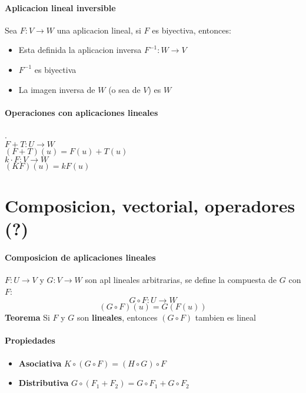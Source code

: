 \documentclass[10pt]{article}
\begin{document}
\paragraph{Aplicacion lineal inversible}

Sea $F:V\rightarrow W$ una aplicacion lineal, si $F$ es biyectiva, entonces:

\begin{itemize}
	\item Esta definida la aplicacion inversa $F^{-1}: W \rightarrow V$
	\item $F^{-1}$ es biyectiva
	\item La imagen inversa de $W$ (o sea de $V$) es $W$
\end{itemize}

\paragraph{Operaciones con aplicaciones lineales}.\\

$F+T: U \rightarrow W$\\
$(F+T)(u) = F(u) + T(u)$\\
\linebreak
$k\cdot F: V \rightarrow W$\\
$(KF)(u) = kF(u)$

\section{Composicion, vectorial, operadores (?)}

\paragraph{Composicion de aplicaciones lineales} $F: U \rightarrow V$ y $G: V \rightarrow W$ son apl lineales arbitrarias, se define la compuesta de $G$ con $F$:
\begin{equation*}
	G \circ F: U \rightarrow W
\end{equation*}
\begin{equation*}
	(G \circ F) (u) = G(F(u))
\end{equation*}
\textbf{Teorema} Si $F$ y $G$ son \textbf{lineales}, entonces $(G \circ F)$ tambien es lineal

\paragraph{Propiedades}
\begin{itemize}
	\item \textbf{Asociativa} $K \circ (G \circ F) = (H \circ G) \circ F$
	\item \textbf{Distributiva} $G \circ (F_1 + F_2) = G\circ F_1 + G \circ F_2$
\end{itemize}
\end{document}
